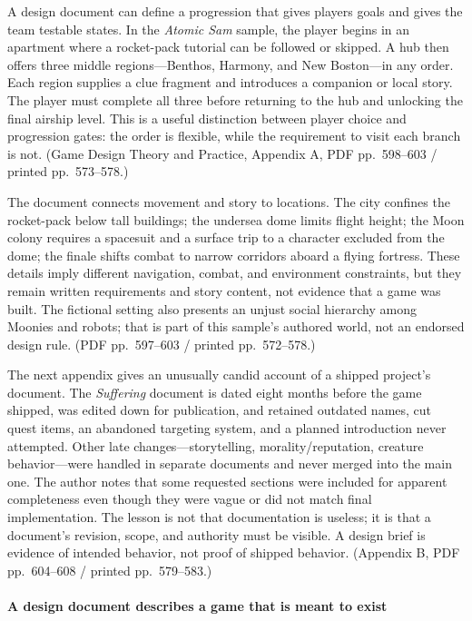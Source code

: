 \hypertarget{05-engine-i-ch009-turn-a-design-document-into-an-observable-route-through-the-game}{}

A design document can define a progression that gives players goals and gives the team testable states. In the \emph{Atomic Sam} sample, the player begins in an apartment where a rocket-pack tutorial can be followed or skipped. A hub then offers three middle regions---Benthos, Harmony, and New Boston---in any order. Each region supplies a clue fragment and introduces a companion or local story. The player must complete all three before returning to the hub and unlocking the final airship level. This is a useful distinction between player choice and progression gates: the order is flexible, while the requirement to visit each branch is not. (Game Design Theory and Practice, Appendix A, PDF pp.~598--603 / printed pp.~573--578.)

The document connects movement and story to locations. The city confines the rocket-pack below tall buildings; the undersea dome limits flight height; the Moon colony requires a spacesuit and a surface trip to a character excluded from the dome; the finale shifts combat to narrow corridors aboard a flying fortress. These details imply different navigation, combat, and environment constraints, but they remain written requirements and story content, not evidence that a game was built. The fictional setting also presents an unjust social hierarchy among Moonies and robots; that is part of this sample's authored world, not an endorsed design rule. (PDF pp.~597--603 / printed pp.~572--578.)

The next appendix gives an unusually candid account of a shipped project's document. The \emph{Suffering} document is dated eight months before the game shipped, was edited down for publication, and retained outdated names, cut quest items, an abandoned targeting system, and a planned introduction never attempted. Other late changes---storytelling, morality/reputation, creature behavior---were handled in separate documents and never merged into the main one. The author notes that some requested sections were included for apparent completeness even though they were vague or did not match final implementation. The lesson is not that documentation is useless; it is that a document's revision, scope, and authority must be visible. A design brief is evidence of intended behavior, not proof of shipped behavior. (Appendix B, PDF pp.~604--608 / printed pp.~579--583.)

\paragraph{A design document describes a game that is meant to exist}\label{05-engine-i-ch009-a-design-document-describes-a-game-that-is-meant-to-exist}

